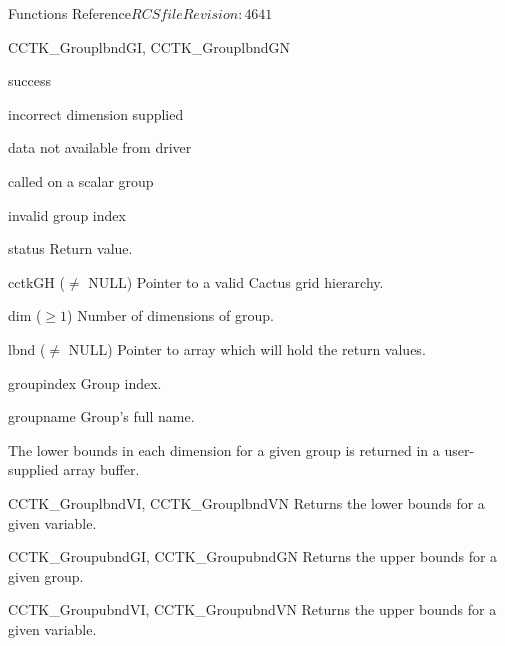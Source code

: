 \begin{cactuspart}{ Functions Reference}{$RCSfile$}{$Revision: 4641 $}
\begin{FunctionDescription}{CCTK\_GrouplbndGI, CCTK\_GrouplbndGN}
\begin{ResultSection}
\begin{Result}{0} success \end{Result}
\begin{Result}{-1} incorrect dimension supplied \end{Result}
\begin{Result}{-2} data not available from driver \end{Result}
\begin{Result}{-3} called on a scalar group \end{Result}
\begin{Result}{-4} invalid group index \end{Result}
\end{ResultSection}

\begin{ParameterSection}
\begin{Parameter}{status} Return value. \end{Parameter}
\begin{Parameter}{cctkGH ($\ne$ NULL)} Pointer to a valid Cactus grid hierarchy. \end{Parameter}
\begin{Parameter}{dim ($\ge 1$)} Number of dimensions of group. \end{Parameter}
\begin{Parameter}{lbnd ($\ne$ NULL)} Pointer to array which will hold the return values. \end{Parameter}
\begin{Parameter}{groupindex} Group index. \end{Parameter}
\begin{Parameter}{groupname} Group's full name. \end{Parameter}
\end{ParameterSection}

\begin{Discussion}
The lower bounds in each dimension for a given group is returned in a user-supplied array buffer.
\end{Discussion}

\begin{SeeAlsoSection}
\begin{SeeAlso}{CCTK\_GrouplbndVI, CCTK\_GrouplbndVN}
Returns the lower bounds for a given variable.
\end{SeeAlso}
\begin{SeeAlso}{CCTK\_GroupubndGI, CCTK\_GroupubndGN}
Returns the upper bounds for a given group.
\end{SeeAlso}
\begin{SeeAlso}{CCTK\_GroupubndVI, CCTK\_GroupubndVN}
Returns the upper bounds for a given variable.
\end{SeeAlso}
\end{SeeAlsoSection}
\end{FunctionDescription}



\end{cactuspart}
